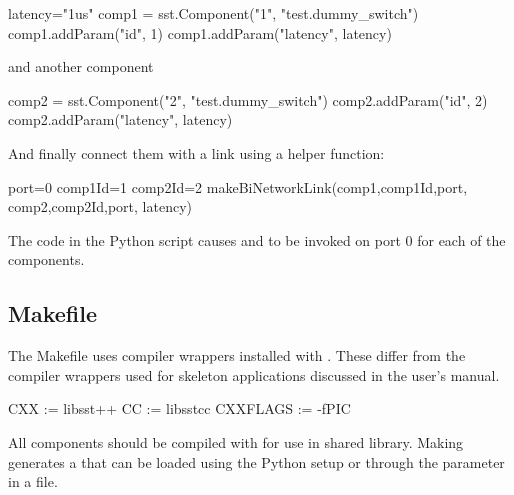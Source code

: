 \begin{CppCode}
latency="1us"
comp1 = sst.Component("1", "test.dummy_switch")
comp1.addParam("id", 1)
comp1.addParam("latency", latency)
\end{CppCode}
and another component

\begin{CppCode}
comp2 = sst.Component("2", "test.dummy_switch")
comp2.addParam("id", 2)
comp2.addParam("latency", latency)
\end{CppCode}
And finally connect them with a link using a \sstmacro helper function:

\begin{CppCode}
port=0
comp1Id=1
comp2Id=2
makeBiNetworkLink(comp1,comp1Id,port,
                  comp2,comp2Id,port,
                  latency)
\end{CppCode}
The code in the Python script causes  and  to be invoked on port 0 for each of the components.

\subsection{Makefile}
The Makefile uses compiler wrappers installed with \sstmacro.
These differ from the compiler wrappers used for skeleton applications discussed in the user's manual.

\begin{ViFile}
CXX :=    libsst++
CC :=     libsstcc
CXXFLAGS := -fPIC
\end{ViFile}
All components should be compiled with  for use in shared library.
Making generates a  that can be loaded using the Python setup or through the  parameter in a  file.


